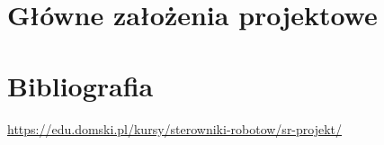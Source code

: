 \documentclass[12pt,a4paper]{article}
\begin{document}
\maketitle
\tableofcontents
\newpage

\section{Główne założenia projektowe}


\section{Bibliografia}
\url{https://edu.domski.pl/kursy/sterowniki-robotow/sr-projekt/}
\end{document}
